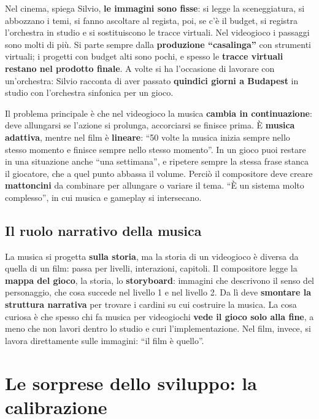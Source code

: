 Nel cinema, spiega Silvio, \textbf{le immagini sono fisse}: si legge la
sceneggiatura, si abbozzano i temi, si fanno ascoltare al regista, poi, se c'è il
budget, si registra l'orchestra in studio e si sostituiscono le tracce virtuali.
Nel videogioco i passaggi sono molti di più. Si parte sempre dalla
\textbf{produzione ``casalinga''} con strumenti virtuali; i progetti con budget
alti sono pochi, e spesso le \textbf{tracce virtuali restano nel prodotto finale}.
A volte si ha l'occasione di lavorare con un'orchestra: Silvio racconta di aver
passato \textbf{quindici giorni a Budapest} in studio con l'orchestra sinfonica
per un gioco.

Il problema principale è che nel videogioco la musica \textbf{cambia in
continuazione}: deve allungarsi se l'azione si prolunga, accorciarsi se finisce
prima. È \textbf{musica adattiva}, mentre nel film è \textbf{lineare}: ``50 volte
la musica inizia sempre nello stesso momento e finisce sempre nello stesso
momento''. In un gioco puoi restare in una situazione anche ``una settimana'', e
ripetere sempre la stessa frase stanca il giocatore, che a quel punto abbassa il
volume. Perciò il compositore deve creare \textbf{mattoncini} da combinare per
allungare o variare il tema. ``È un sistema molto complesso'', in cui musica e
gameplay si intersecano.

\subsection{Il ruolo narrativo della musica}

La musica si progetta \textbf{sulla storia}, ma la storia di un videogioco è
diversa da quella di un film: passa per livelli, interazioni, capitoli. Il
compositore legge la \textbf{mappa del gioco}, la storia, lo
\textbf{storyboard}: immagini che descrivono il senso del personaggio, che cosa
succede nel livello 1 e nel livello 2. Da lì deve \textbf{smontare la struttura
narrativa} per trovare i cardini su cui costruire la musica. La cosa curiosa è
che spesso chi fa musica per videogiochi \textbf{vede il gioco solo alla fine},
a meno che non lavori dentro lo studio e curi l'implementazione. Nel film,
invece, si lavora direttamente sulle immagini: ``il film è quello''.

\section{Le sorprese dello sviluppo: la calibrazione}
\label{sec:c1-5-calibrazione}

